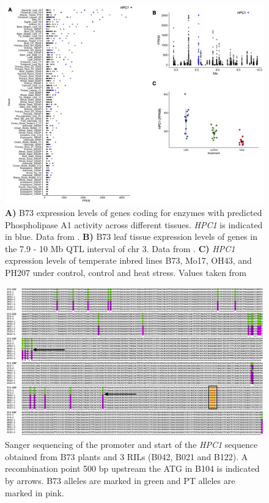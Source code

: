 \documentclass[9pt,twocolumn,twoside,lineno]{BioRxiv}
\begin{document}
\begin{figure}[t]
\begin{center}
\includegraphics[width=0.8\paperwidth]{Sup_Figures/Sup_Fig_5.png}
\caption{\textbf{A)} B73 expression levels of genes coding for enzymes with predicted Phospholipase A1 activity across different tissues. \textit{HPC1} is indicated in blue. 
Data from \cite{Stelpflug2016-vr}.
\textbf{B)} B73 leaf tissue expression levels of genes in the 7.9 - 10 Mb QTL interval of chr 3. 
Data from \cite{Stelpflug2016-vr}.
\textbf{C)} \textit{HPC1} expression levels of temperate inbred lines B73, Mo17, OH43, and PH207 under control, control and heat stress. Values taken from \cite{Waters2017-nat}
} 
\label{SupFig5}
\end{center}
\end{figure} 

\clearpage

\begin{figure}[t]
\begin{center}
\includegraphics[width=0.9\paperwidth]{Sup_Figures/Sup_Fig_6.png}
\caption{Sanger sequencing of the promoter and start of the \textit{HPC1} sequence obtained from B73 plants and 3 RILs (B042, B021 and B122). A recombination point 500 bp upstream the ATG in B104 is indicated by arrows. B73 alleles are marked in green and PT alleles are marked in pink. 
}
\label{SupFig6}
\end{center}
\end{figure} 
\end{document}
